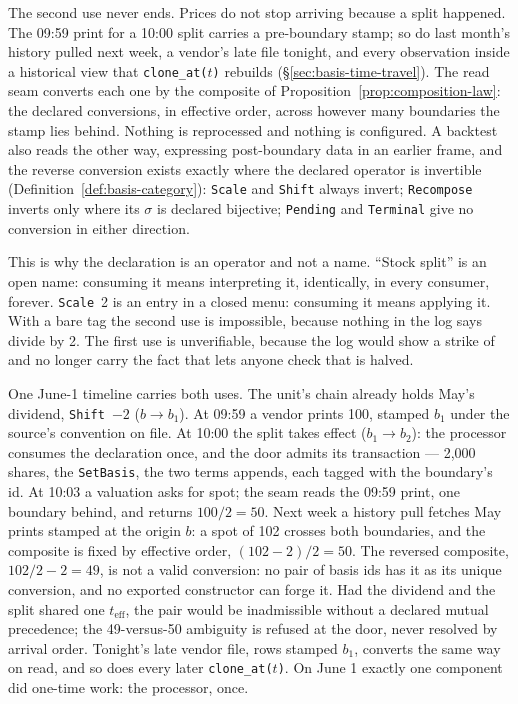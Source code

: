 The second use never ends. Prices do not stop arriving because a split
happened. The 09:59 print for a 10:00 split carries a pre-boundary stamp; so
do last month's history pulled next week, a vendor's late file tonight, and
every observation inside a historical view that \texttt{clone\_at($t$)}
rebuilds (\S\ref{sec:basis-time-travel}). The read seam converts each one by the composite of
Proposition~\ref{prop:composition-law}: the declared conversions, in effective
order, across however many boundaries the stamp lies behind. Nothing is
reprocessed and nothing is configured. A backtest also reads the other way,
expressing post-boundary data in an earlier frame, and the reverse conversion
exists exactly where the declared operator is invertible
(Definition~\ref{def:basis-category}): \texttt{Scale} and \texttt{Shift}
always invert; \texttt{Recompose} inverts only where its $\sigma$ is declared
bijective; \texttt{Pending} and \texttt{Terminal} give no conversion in
either direction.

This is why the declaration is an operator and not a name. ``Stock split'' is
an open name: consuming it means interpreting it, identically, in every
consumer, forever. \texttt{Scale}~2 is an entry in a closed menu: consuming it
means applying it. With a bare tag the second use is impossible, because
nothing in the log says divide by 2. The first use is unverifiable, because
the log would show a strike of  and no longer carry the fact that lets
anyone check that  is  halved.

One June-1 timeline carries both uses. The unit's chain already holds May's
 dividend, \texttt{Shift}~$-2$ ($b\to b_1$). At 09:59 a vendor prints
100, stamped $b_1$ under the source's convention on file. At 10:00 the split
takes effect ($b_1\to b_2$): the processor consumes the declaration once, and
the door admits its transaction --- 2{,}000 shares, the \texttt{SetBasis}, the
two terms appends, each tagged with the boundary's id. At 10:03 a valuation
asks for spot; the seam reads the 09:59 print, one boundary behind, and
returns $100/2=50$. Next week a history pull fetches May prints stamped at the
origin $b$: a spot of 102 crosses both boundaries, and the composite is fixed
by effective order, $(102-2)/2=50$. The reversed composite, $102/2-2=49$, is
not a valid conversion: no pair of basis ids has it as its unique conversion,
and no exported constructor can forge it. Had the dividend and the split
shared one $t_{\mathrm{eff}}$, the pair would be inadmissible without a
declared mutual precedence; the 49-versus-50 ambiguity is refused at the door,
never resolved by arrival order. Tonight's late vendor file, rows stamped
$b_1$, converts the same way on read, and so does every later
\texttt{clone\_at($t$)}. On June 1 exactly one component did one-time work:
the processor, once.

